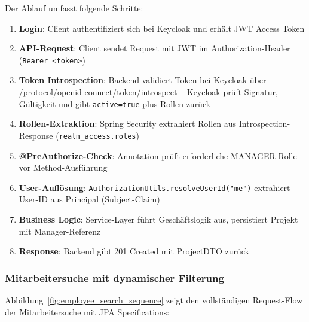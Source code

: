 Der Ablauf umfasst folgende Schritte:

\begin{enumerate}[noitemsep]
    \item \textbf{Login}: Client authentifiziert sich bei Keycloak und erhält JWT Access Token
    \item \textbf{API-Request}: Client sendet Request mit JWT im Authorization-Header (\texttt{Bearer <token>})
    \item \textbf{Token Introspection}: Backend validiert Token bei Keycloak über /protocol/openid-connect/token/introspect -- Keycloak prüft Signatur, Gültigkeit und gibt \texttt{active=true} plus Rollen zurück
    \item \textbf{Rollen-Extraktion}: Spring Security extrahiert Rollen aus Introspection-Response (\texttt{realm\_access.roles})
    \item \textbf{@PreAuthorize-Check}: Annotation prüft erforderliche MANAGER-Rolle vor Method-Ausführung
    \item \textbf{User-Auflösung}: \texttt{AuthorizationUtils.resolveUserId("me")} extrahiert User-ID aus Principal (Subject-Claim)
    \item \textbf{Business Logic}: Service-Layer führt Geschäftslogik aus, persistiert Projekt mit Manager-Referenz
    \item \textbf{Response}: Backend gibt 201 Created mit ProjectDTO zurück
\end{enumerate}

\subsubsection{Mitarbeitersuche mit dynamischer Filterung}

Abbildung~\ref{fig:employee_search_sequence} zeigt den vollständigen Request-Flow der Mitarbeitersuche mit JPA Specifications:

